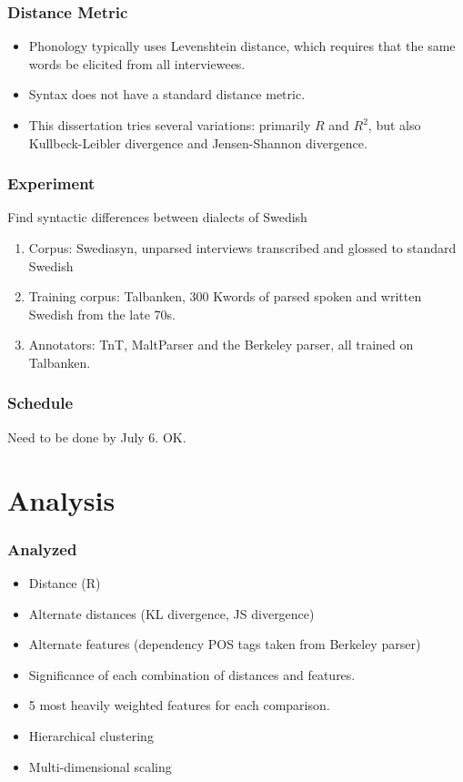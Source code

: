 \documentclass{beamer}
\begin{document}
\begin{frame}
  \frametitle{Distance Metric}
  \begin{itemize}
  \item Phonology typically uses Levenshtein distance, which requires
    that the same words be elicited from all interviewees.
  \item Syntax does not have a standard distance metric.
  \item This dissertation tries several variations: primarily $R$ and $R^2$, but
    also Kullbeck-Leibler divergence and Jensen-Shannon divergence.
  \end{itemize}
\end{frame}

\begin{frame}
  \frametitle{Experiment}
  Find syntactic differences between dialects of Swedish
  \begin{enumerate}
  \item Corpus: Swediasyn, unparsed interviews transcribed and glossed
    to standard Swedish
  \item Training corpus: Talbanken, 300 Kwords of parsed spoken and
    written Swedish from the late 70s.
  \item Annotators: TnT, MaltParser and the Berkeley parser, all
    trained on Talbanken.
  \end{enumerate}
\end{frame}
\begin{frame}
  \frametitle{Schedule}
  Need to be done by July 6. OK.
\end{frame}

\section{Analysis}
\begin{frame}
\frametitle{Analyzed}
\begin{itemize}
\item Distance (R)
\item Alternate distances (KL divergence, JS divergence)
\item Alternate features (dependency POS tags taken from Berkeley
  parser)
\item Significance of each combination of distances and features.
\item 5 most heavily weighted features for each comparison.
\item Hierarchical clustering
\item Multi-dimensional scaling
\end{itemize}
\end{frame}
\end{document}

